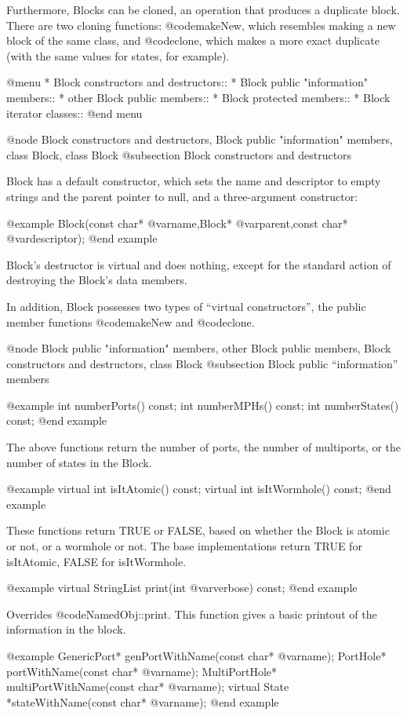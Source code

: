 Furthermore, Blocks can be cloned, an operation that produces a
duplicate block.  There are two cloning functions: @code{makeNew},
which resembles making a new block of the same class, and @code{clone},
which makes a more exact duplicate (with the same values for states,
for example).

@menu
* Block constructors and destructors::
* Block public "information" members::
* other Block public members::
* Block protected members::
* Block iterator classes::
@end menu

@node Block constructors and destructors, Block public "information" members, class Block, class Block
@subsection Block constructors and destructors

Block has a default constructor, which sets the name and
descriptor to empty strings and the parent pointer to null, and a
three-argument constructor:

@example
Block(const char* @var{name},Block* @var{parent},const char* @var{descriptor});
@end example

Block's destructor is virtual and does nothing, except for the standard
action of destroying the Block's data members.

In addition, Block possesses two types of ``virtual constructors'', the
public member functions @code{makeNew} and @code{clone}.

@node Block public "information" members, other Block public members, Block constructors and destructors, class Block
@subsection Block public ``information'' members

@example
int numberPorts() const;
int numberMPHs() const;
int numberStates() const;
@end example

The above functions return the number of ports, the number of
multiports, or the number of states in the Block.

@example
virtual int isItAtomic() const;
virtual int isItWormhole() const;
@end example

These functions return TRUE or FALSE, based on whether the Block is
atomic or not, or a wormhole or not.  The base implementations return
TRUE for isItAtomic, FALSE for isItWormhole.

@example
virtual StringList print(int @var{verbose}) const;
@end example

Overrides @code{NamedObj::print}.  This function gives a basic printout of
the information in the block.

@example
GenericPort* genPortWithName(const char* @var{name});
PortHole* portWithName(const char* @var{name});
MultiPortHole* multiPortWithName(const char* @var{name});
virtual State *stateWithName(const char* @var{name});
@end example

